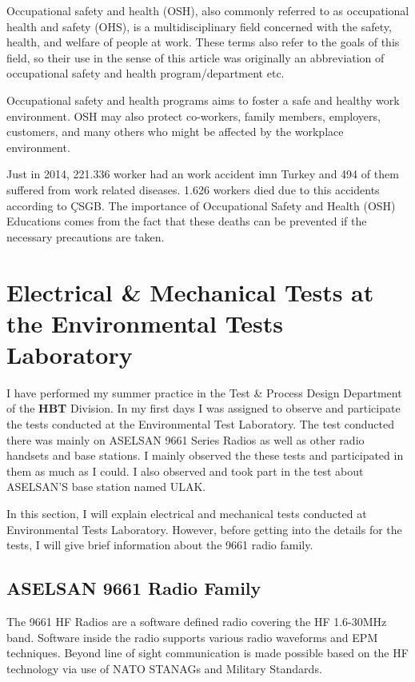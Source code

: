 	Occupational safety and health (OSH), also commonly referred to as occupational health and safety (OHS), is a multidisciplinary field concerned with the safety, health, and welfare of people at work. These terms also refer to the goals of this field, so their use in the sense of this article was originally an abbreviation of occupational safety and health program/department etc\cite{osh}.

	Occupational safety and health programs aims to foster a safe and healthy work environment. OSH may also protect co-workers, family members, employers, customers, and many others who might be affected by the workplace environment. 

	Just in 2014, 221.336 worker had an work accident imn Turkey and 494 of them suffered from work related diseases. 1.626 workers died due to this accidents according to ÇSGB\cite{6331}. The importance of Occupational Safety and Health (OSH) Educations comes from the fact that these deaths can be prevented if the necessary precautions are taken.


\newpage

\section{Electrical \& Mechanical Tests at the Environmental Tests Laboratory }
\- \indent	
	I have performed my summer practice in the Test \& Process Design Department of the \textbf{HBT} Division. In my first days I was assigned to observe and participate the tests conducted at the Environmental Test Laboratory. The test conducted there was mainly on ASELSAN 9661 Series Radios as well as other radio handsets and base stations. I mainly observed the these tests and participated in them as much as I could. I also observed and took part in the test about ASELSAN'S base station named ULAK. 
	
	In this section, I will explain electrical and mechanical tests conducted at Environmental Tests Laboratory. However, before getting into the details for the tests, I will give brief information about the 9661 radio family.   
	
\subsection{ASELSAN 9661 Radio Family}
\- \indent	
	The 9661 HF Radios are a software defined radio covering the HF 1.6-30MHz band. Software inside the radio supports various radio waveforms and EPM techniques. Beyond line of sight communication is made possible based on the HF technology via use of NATO STANAGs and Military Standards\cite{9661}. 


